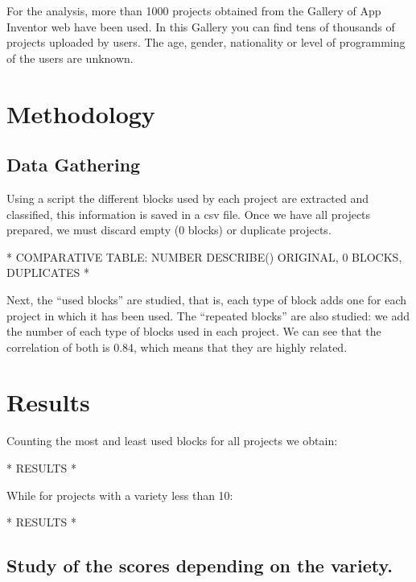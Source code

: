 \documentclass[a4paper]{article}
\begin{document}

For the analysis, more than 1000 projects obtained from the Gallery of App Inventor web have been used. 
In this Gallery you can find tens of thousands of projects uploaded by users. The age, gender, nationality or level of programming of the users are unknown.


\section{Methodology}


\subsection{Data Gathering}

Using a script the different blocks used by each project are extracted and classified, this information is saved in a csv file. Once we have all projects prepared, we must discard empty (0 blocks) or duplicate projects.


* COMPARATIVE TABLE: NUMBER DESCRIBE() ORIGINAL, 0 BLOCKS, DUPLICATES *


Next, the ``used blocks'' are studied, that is, each type of block adds one for each project in which it has been used. The ``repeated blocks'' are also studied: we add the number of each type of blocks used in each project. We can see that the correlation of both is 0.84, which means that they are highly related.

\section{Results}

Counting the most and least used blocks for all projects we obtain:

* RESULTS *

While for projects with a variety less than 10:

* RESULTS *


\subsection{Study of the scores depending on the variety.}
\end{document}
